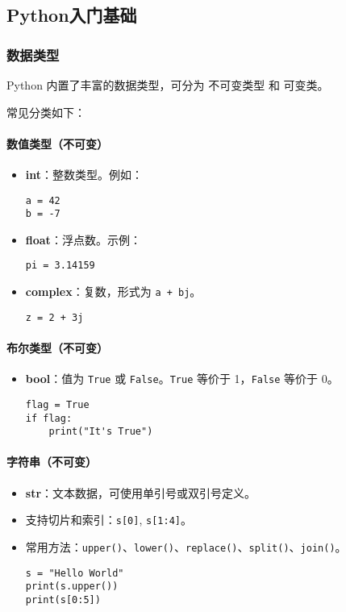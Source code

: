 \documentclass[a4paper,12pt]{ctexart}
\begin{document}
\subsection{Python入门基础}

\subsubsection{数据类型}
Python 内置了丰富的数据类型，可分为 不可变类型 和 可变类。  

\noindent 常见分类如下：

\paragraph{数值类型（不可变）}
\begin{itemize}
  \item \textbf{int}：整数类型。例如：
\begin{lstlisting}
a = 42
b = -7
\end{lstlisting}
  \item \textbf{float}：浮点数。示例：
\begin{lstlisting}
pi = 3.14159
\end{lstlisting}
  \item \textbf{complex}：复数，形式为 \texttt{a + bj}。
\begin{lstlisting}
z = 2 + 3j
\end{lstlisting}
\end{itemize}

\paragraph{布尔类型（不可变）}
\begin{itemize}
  \item \textbf{bool}：值为 \texttt{True} 或 \texttt{False}。\texttt{True} 等价于 1，\texttt{False} 等价于 0。
\begin{lstlisting}
flag = True
if flag:
    print("It's True")
\end{lstlisting}
\end{itemize}

\paragraph{字符串（不可变）}
\begin{itemize}
  \item \textbf{str}：文本数据，可使用单引号或双引号定义。
\item 支持切片和索引：\texttt{s[0]}, \texttt{s[1:4]}。
\item 常用方法：\texttt{upper()}、\texttt{lower()}、\texttt{replace()}、\texttt{split()}、\texttt{join()}。
\begin{lstlisting}
s = "Hello World"
print(s.upper())
print(s[0:5])
\end{lstlisting}
\end{itemize}
\end{document}
